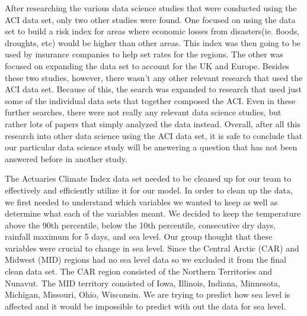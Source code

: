 \documentclass[12pt]{report}
\begin{document}
		\par After researching the various data science studies that were conducted using the ACI data set, only two other studies were found. One focused on using the data set to build a risk index for areas where economic losses from disasters(ie. floods, droughts, etc)  would be higher than other areas. This index was then going to be used by insurance companies to help set rates for the regions. The other was focused on expanding the data set to account for the UK and Europe. Besides these two studies, however, there wasn't any other relevant research that used the ACI data set. Because of this, the search was expanded to research that used just some of the individual data sets that together composed the ACI. Even in these further searches, there were not really any relevant data science studies, but rather lots of papers that simply analyzed the data instead. Overall, after all this research into other data science using the ACI data set, it is safe to conclude that our particular data science study will be answering a question that has not been answered before in another study.
		\par The Actuaries Climate Index data set needed to be cleaned up for our team to effectively and efficiently utilize it for our model. In order to clean up the data, we first needed to understand which variables we wanted to keep as well as determine what each of the variables meant. We decided to keep  the temperature above the 90th percentile, below the 10th percentile, consecutive dry days, rainfall maximum for 5 days, and sea level. Our group thought that these variables were crucial to change in sea level. Since the Central Arctic (CAR) and Midwest (MID) regions had no sea level data so we excluded it from the final clean data set. The CAR region consisted of the Northern Territories and Nunavut. The MID territory consisted of Iowa, Illinois, Indiana, Minnesota, Michigan, Missouri, Ohio, Wisconsin. We are trying to predict how sea level is affected and it would be impossible to predict with out the data for sea level. 
\end{document}
